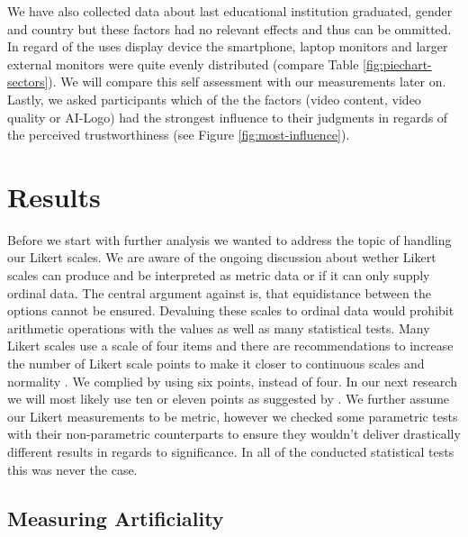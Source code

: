 \documentclass[
  a4paper,  %
  twoside,  %
  bibliography=totoc,
  headsepline,
  cleardoublepage=empty,
  parskip=half,
  draft=false
]{scrbook}
\begin{document}
We have also collected data about last educational institution graduated, gender and country but these factors had no relevant effects and thus can be ommitted. \\
In regard of the uses display device the smartphone, laptop monitors and larger external monitors were quite evenly distributed (compare Table \ref{fig:piechart-sectors}). We will compare this self assessment with our measurements later on. \\
Lastly, we asked participants which of the the factors (video content, video quality or AI-Logo) had the strongest influence to their judgments in regards of the perceived trustworthiness (see Figure \ref{fig:most-influence}).

\section{Results}
\label{sec:results}

Before we start with further analysis we wanted to address the topic of handling our Likert scales. We are aware of the ongoing discussion about wether Likert scales can produce and be interpreted as metric data or if it can only supply ordinal data. The central argument against is, that equidistance between the options cannot be ensured. Devaluing these scales to ordinal data would prohibit arithmetic operations with the values as well as many statistical tests. Many Likert scales use a scale of four items and there are recommendations to increase the number of Likert scale points to make it closer to continuous scales and normality \cite{wuCanLikertScales2017a}. We complied by using six points, instead of four. In our next research we will most likely use ten or eleven points as suggested by . We further assume our Likert measurements to be metric, however we checked some parametric tests with their non-parametric counterparts to ensure they wouldn't deliver drastically different results in regards to significance. In all of the conducted statistical tests this was never the case.

\subsection{Measuring Artificiality}
\end{document}
